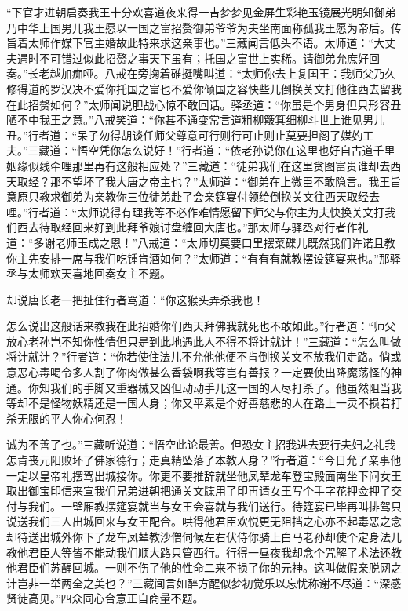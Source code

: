 \documentclass[12pt,UTF8]{ctexbook}
\begin{document}
“下官才进朝启奏我王十分欢喜道夜来得一吉梦梦见金屏生彩艳玉镜展光明知御弟乃中华上国男儿我王愿以一国之富招赘御弟爷爷为夫坐南面称孤我王愿为帝后。传旨着太师作媒下官主婚故此特来求这亲事也。”三藏闻言低头不语。太师道：“大丈夫遇时不可错过似此招赘之事天下虽有；托国之富世上实稀。请御弟允庶好回奏。”长老越加痴哑。八戒在旁掬着碓挺嘴叫道：“太师你去上复国王：我师父乃久修得道的罗汉决不爱你托国之富也不爱你倾国之容快些儿倒换关文打他往西去留我在此招赘如何？”太师闻说胆战心惊不敢回话。驿丞道：“你虽是个男身但只形容丑陋不中我王之意。”八戒笑道：“你甚不通变常言道粗柳簸箕细柳斗世上谁见男儿丑。”行者道：“呆子勿得胡谈任师父尊意可行则行可止则止莫要担阁了媒妁工夫。”三藏道：“悟空凭你怎么说好！”行者道：“依老孙说你在这里也好自古道千里姻缘似线牵哩那里再有这般相应处？”三藏道：“徒弟我们在这里贪图富贵谁却去西天取经？那不望坏了我大唐之帝主也？”太师道：“御弟在上微臣不敢隐言。我王旨意原只教求御弟为亲教你三位徒弟赴了会亲筵宴付领给倒换关文往西天取经去哩。”行者道：“太师说得有理我等不必作难情愿留下师父与你主为夫快换关文打我们西去待取经回来好到此拜爷娘讨盘缠回大唐也。”那太师与驿丞对行者作礼道：“多谢老师玉成之恩！”八戒道：“太师切莫要口里摆菜碟儿既然我们许诺且教你主先安排一席与我们吃锺肯酒如何？”太师道：“有有有就教摆设筵宴来也。”那驿丞与太师欢天喜地回奏女主不题。

却说唐长老一把扯住行者骂道：“你这猴头弄杀我也！

怎么说出这般话来教我在此招婚你们西天拜佛我就死也不敢如此。”行者道：“师父放心老孙岂不知你性情但只是到此地遇此人不得不将计就计！”三藏道：“怎么叫做将计就计？”行者道：“你若使住法儿不允他他便不肯倒换关文不放我们走路。倘或意恶心毒喝令多人割了你肉做甚么香袋啊我等岂有善报？一定要使出降魔荡怪的神通。你知我们的手脚又重器械又凶但动动手儿这一国的人尽打杀了。他虽然阻当我等却不是怪物妖精还是一国人身；你又平素是个好善慈悲的人在路上一灵不损若打杀无限的平人你心何忍！

诚为不善了也。”三藏听说道：“悟空此论最善。但恐女主招我进去要行夫妇之礼我怎肯丧元阳败坏了佛家德行；走真精坠落了本教人身？”行者道：“今日允了亲事他一定以皇帝礼摆驾出城接你。你更不要推辞就坐他凤辇龙车登宝殿面南坐下问女王取出御宝印信来宣我们兄弟进朝把通关文牒用了印再请女王写个手字花押佥押了交付与我们。一壁厢教摆筵宴就当与女王会喜就与我们送行。待筵宴已毕再叫排驾只说送我们三人出城回来与女王配合。哄得他君臣欢悦更无阻挡之心亦不起毒恶之念却待送出城外你下了龙车凤辇教沙僧伺候左右伏侍你骑上白马老孙却使个定身法儿教他君臣人等皆不能动我们顺大路只管西行。行得一昼夜我却念个咒解了术法还教他君臣们苏醒回城。一则不伤了他的性命二来不损了你的元神。这叫做假亲脱网之计岂非一举两全之美也？”三藏闻言如醉方醒似梦初觉乐以忘忧称谢不尽道：“深感贤徒高见。”四众同心合意正自商量不题。
\end{document}
